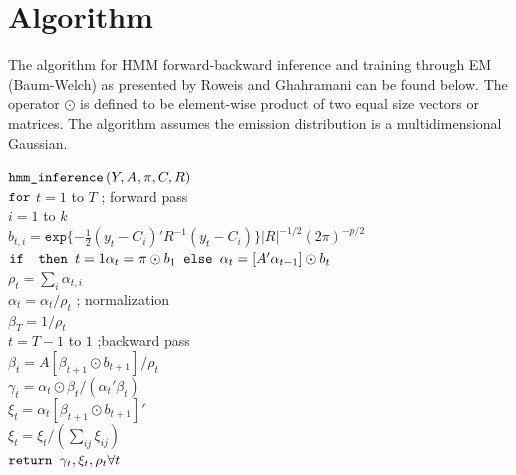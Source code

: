 \section{Algorithm}

The algorithm for HMM forward-backward inference and training through EM
(Baum-Welch) as presented by Roweis and Ghahramani \cite{ghahramani} can be
found below. The operator $\odot$ is defined to be element-wise product of two
equal size vectors or matrices. The algorithm assumes the emission distribution
is a multidimensional Gaussian.

\begin{algorithm}[h]
\begin{pseudocode}
\codename $\mbox{\texttt{hmm\_inference}}\left(Y,A,\pi,C,R\right)$\\
\codeline $\mbox{\texttt{for}} $ $t=1$ to  $T$  ; forward pass \\
\codeline \>  $i=1$ to $k$ \\
\codeline \> \> $b_{t,i}=\texttt{exp}\{-\frac{1}{2}(y_t - C_i)'R^{-1}(y_t - C_i)\}|R|^{-1/2}(2\pi)^{-p/2}$\\
\codeline \> $\mbox{\texttt{if }} \mbox{\texttt{ then }} t=1 \alpha_t = \pi \odot b_1\mbox{\texttt{ else }} \alpha_t = [A'\alpha_{t-1}]\odot b_t$ \\
\codeline \> $\rho_t = \sum_i \alpha_{t,i}$\\
\codeline \> $\alpha_t = \alpha_t / \rho_t$ ; normalization \\
\codeline  $\beta_T = 1/\rho_t$ \\
\codeline {} $t=T-1$ to $1$ ;backward pass\\
\codeline \> $\beta_t = A[\beta_{t+1} \odot b_{t+1}]/ \rho_t$\\
\codeline  $\gamma_t = \alpha_t \odot \beta_t / (\alpha_t'\beta_t)$\\
\codeline  $\xi_t = \alpha_t[\beta_{t+1} \odot b_{t+1}]'$\\
\codeline  $\xi_t = \xi_t / (\sum_{ij}\xi_{ij})$\\
\codeline  $\mbox{\texttt{return }} \gamma_t, \xi_t, \rho_t \forall t$
\end{pseudocode}
\end{algorithm}

